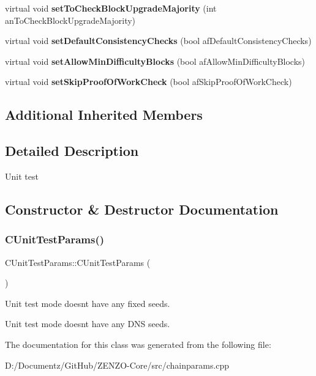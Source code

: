 \begin{DoxyCompactItemize}
virtual void {\bfseries set\+To\+Check\+Block\+Upgrade\+Majority} (int an\+To\+Check\+Block\+Upgrade\+Majority)
\item 
\mbox{\label{class_c_unit_test_params_af48708fb6ca2926a9b8af27f54593469}} 
virtual void {\bfseries set\+Default\+Consistency\+Checks} (bool af\+Default\+Consistency\+Checks)
\item 
\mbox{\label{class_c_unit_test_params_a87f2d28879e0b81f9f92356ea5a4da24}} 
virtual void {\bfseries set\+Allow\+Min\+Difficulty\+Blocks} (bool af\+Allow\+Min\+Difficulty\+Blocks)
\item 
\mbox{\label{class_c_unit_test_params_aedc2ff95f1b9d8b5bcbdac33774fe8a0}} 
virtual void {\bfseries set\+Skip\+Proof\+Of\+Work\+Check} (bool af\+Skip\+Proof\+Of\+Work\+Check)
\end{DoxyCompactItemize}
\subsection*{Additional Inherited Members}


\subsection{Detailed Description}
Unit test 

\subsection{Constructor \& Destructor Documentation}
\mbox{\label{class_c_unit_test_params_a851e71faf703b4e2f611083c79b7eb92}} 
\subsubsection{\texorpdfstring{CUnitTestParams()}{CUnitTestParams()}}
{\footnotesize\ttfamily C\+Unit\+Test\+Params\+::\+C\+Unit\+Test\+Params (\begin{DoxyParamCaption}{ }\end{DoxyParamCaption})\hspace{0.3cm}{\ttfamily [inline]}}

Unit test mode doesn\textquotesingle{}t have any fixed seeds.

Unit test mode doesn\textquotesingle{}t have any D\+NS seeds. 

The documentation for this class was generated from the following file\+:\begin{DoxyCompactItemize}
\item 
D\+:/\+Documentz/\+Git\+Hub/\+Z\+E\+N\+Z\+O-\/\+Core/src/chainparams.\+cpp\end{DoxyCompactItemize}
